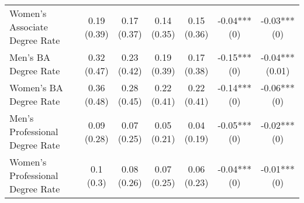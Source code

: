 \begin{landscape}
\begin{ThreePartTable}
\begin{longtable}[t]{>{\raggedright\arraybackslash}p{5cm}cccccc}
\hspace{1em}Women’s Associate Degree Rate & \specialcell{0.19\\(0.39)} & \specialcell{0.17\\(0.37)} & \specialcell{0.14\\(0.35)} & \specialcell{0.15\\(0.36)} & \specialcell{-0.04***\\(0)} & \specialcell{-0.03***\\(0)}\\
\hspace{1em}Men’s BA Degree Rate & \specialcell{0.32\\(0.47)} & \specialcell{0.23\\(0.42)} & \specialcell{0.19\\(0.39)} & \specialcell{0.17\\(0.38)} & \specialcell{-0.15***\\(0)} & \specialcell{-0.04***\\(0.01)}\\
\hspace{1em}Women’s BA Degree Rate & \specialcell{0.36\\(0.48)} & \specialcell{0.28\\(0.45)} & \specialcell{0.22\\(0.41)} & \specialcell{0.22\\(0.41)} & \specialcell{-0.14***\\(0)} & \specialcell{-0.06***\\(0)}\\
\hspace{1em}Men’s Professional Degree Rate & \specialcell{0.09\\(0.28)} & \specialcell{0.07\\(0.25)} & \specialcell{0.05\\(0.21)} & \specialcell{0.04\\(0.19)} & \specialcell{-0.05***\\(0)} & \specialcell{-0.02***\\(0)}\\
\addlinespace
\hspace{1em}Women’s Professional Degree Rate & \specialcell{0.1\\(0.3)} & \specialcell{0.08\\(0.26)} & \specialcell{0.07\\(0.25)} & \specialcell{0.06\\(0.23)} & \specialcell{-0.04***\\(0)} & \specialcell{-0.01***\\(0)}\\

\end{longtable}
\end{ThreePartTable}
\end{landscape}
